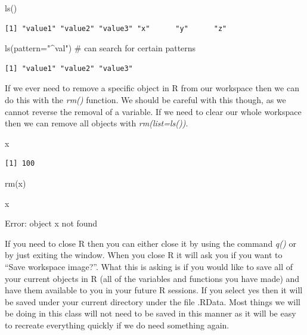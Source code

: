 \documentclass[
  letterpaper,
  DIV=11,
  numbers=noendperiod]{scrreprt}
\newenvironment{Shaded}{\begin{snugshade}}{\end{snugshade}}
\newcommand{\AttributeTok}[1]{\textcolor[rgb]{0.40,0.45,0.13}{#1}}
\newcommand{\CommentTok}[1]{\textcolor[rgb]{0.37,0.37,0.37}{#1}}
\newcommand{\FunctionTok}[1]{\textcolor[rgb]{0.28,0.35,0.67}{#1}}
\newcommand{\NormalTok}[1]{\textcolor[rgb]{0.00,0.23,0.31}{#1}}
\newcommand{\StringTok}[1]{\textcolor[rgb]{0.13,0.47,0.30}{#1}}
\begin{document}
\begin{Shaded}
\begin{Highlighting}[]
\FunctionTok{ls}\NormalTok{()}
\end{Highlighting}
\end{Shaded}

\begin{verbatim}
[1] "value1" "value2" "value3" "x"      "y"      "z"     
\end{verbatim}

\begin{Shaded}
\begin{Highlighting}[]
\FunctionTok{ls}\NormalTok{(}\AttributeTok{pattern=}\StringTok{"\^{}val"}\NormalTok{) }\CommentTok{\# can search for certain patterns}
\end{Highlighting}
\end{Shaded}

\begin{verbatim}
[1] "value1" "value2" "value3"
\end{verbatim}

If we ever need to remove a specific object in R from our workspace then
we can do this with the \emph{rm()} function. We should be careful with
this though, as we cannot reverse the removal of a variable. If we need
to clear our whole workspace then we can remove all objects with
\emph{rm(list=ls())}.

\begin{Shaded}
\begin{Highlighting}[]
\NormalTok{x}
\end{Highlighting}
\end{Shaded}

\begin{verbatim}
[1] 100
\end{verbatim}

\begin{Shaded}
\begin{Highlighting}[]
\FunctionTok{rm}\NormalTok{(x)}
\end{Highlighting}
\end{Shaded}

\begin{Shaded}
\begin{Highlighting}[]
\NormalTok{x}
\end{Highlighting}
\end{Shaded}

{Error: object \textquotesingle x\textquotesingle{} not found}

If you need to close R then you can either close it by using the command
\emph{q()} or by just exiting the window. When you close R it will ask
you if you want to ``Save workspace image?''. What this is asking is if
you would like to save all of your current objects in R (all of the
variables and functions you have made) and have them available to you in
your future R sessions. If you select yes then it will be saved under
your current directory under the file .RData. Most things we will be
doing in this class will not need to be saved in this manner as it will
be easy to recreate everything quickly if we do need something again.
\end{document}
